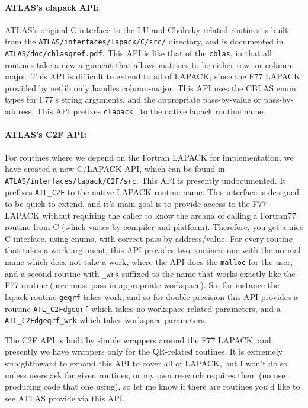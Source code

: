 \documentclass[11pt]{article}
\begin{document}
\paragraph{ATLAS's clapack API:}
ATLAS's original C interface to the LU and Cholesky-related routines
is built from the {\tt ATLAS/interfaces/lapack/C/src/} directory,
and is documented in {\tt ATLAS/doc/cblasqref.pdf}.  This API
is like that of the {\tt cblas}, in that all routines take a
new argument that allows matrices to be either row- or column-major.
This API is difficult to extend to all of LAPACK, since the F77
LAPACK provided by netlib only handles column-major.  This API
uses the CBLAS enum types for F77's string arguments, and the
appropriate pass-by-value or pass-by-address.  This API prefixes
{\tt clapack\_} to the native lapack routine name.

\paragraph{ATLAS's C2F API:}
For routines where we depend on the Fortran LAPACK for implementation,
we have created a new C/LAPACK API, which can be found in \\
{\tt ATLAS/interfaces/lapack/C2F/src}.  This API is presently
undocumented.  It prefixes {\tt ATL\_C2F} to the native LAPACK
routine name.
This interface is designed to be quick to extend, and it's main
goal is to provide access to the F77 LAPACK without requiring the
caller to know the arcana of calling a Fortran77 routine from C
(which varies by compiler and platform).  Therefore, you get a 
nice C interface, using enums, with correct pass-by-address/value.
For every routine that takes a work argument, this API provides
two routines: one with the normal name which does \underline{not} take
a work, where the API does the {\tt malloc} for the user, and a second
routine with {\tt \_wrk} suffixed to the name that works exactly
like the F77 routine (user must pass in appropriate workspace).
So, for instance the lapack routine {\tt geqrf} takes work, and
so for double precision this API provides a routine {\tt ATL\_C2Fdgeqrf}
which takes no workspace-related parameters, and a 
{\tt ATL\_C2Fdgeqrf\_wrk} which takes workspace parameters.

The C2F API is built by simple wrappers around the F77 LAPACK,
and presently we have wrappers only for the QR-related routines.
It is extremely straightfoward to expand this API to cover all
of LAPACK, but I won't do so unless users ask for given routines,
or my own research requires them (no use producing code that
one using), so let me know if there are routines you'd like to
see ATLAS provide via this API.
\end{document}

